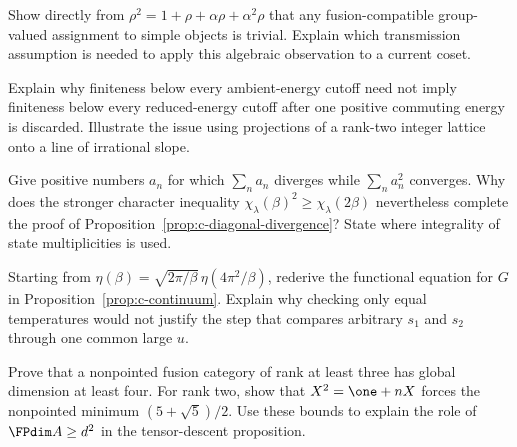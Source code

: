\begin{exercise}\label{ex:c-coset-6}
Show directly from $\rho^2=1+\rho+\alpha\rho+\alpha^2\rho$
that any fusion-compatible group-valued assignment to simple objects
is trivial. Explain which transmission assumption is needed to apply
this algebraic observation to a current coset.

\par\smallskip{}\par
\end{exercise}
\begin{exercise}\label{ex:c-coset-7}
Explain why finiteness below every ambient-energy cutoff need not
imply finiteness below every reduced-energy cutoff after one positive
commuting energy is discarded. Illustrate the issue using projections of a
rank-two integer lattice onto a line of irrational slope.

\par\smallskip{}\par
\end{exercise}
\begin{exercise}\label{ex:c-coset-8}
Give positive numbers $a_n$ for which $\sum_n a_n$ diverges while
$\sum_n a_n^2$ converges. Why does the stronger character inequality
$\chi_\lambda(\beta)^2\geq\chi_\lambda(2\beta)$ nevertheless complete
the proof of Proposition~\ref{prop:c-diagonal-divergence}?
State where integrality of state multiplicities is used.

\par\smallskip{}\par
\end{exercise}
\begin{exercise}\label{ex:c-coset-9}
Starting from $\eta(\beta)=\sqrt{2\pi/\beta}\,
\eta(4\pi^2/\beta)$, rederive the functional equation for $G$ in
Proposition~\ref{prop:c-continuum}. Explain why checking only equal
temperatures would not justify the step that compares arbitrary
$s_1$ and $s_2$ through one common large $u$.

\par\smallskip{}\par
\end{exercise}
\begin{exercise}\label{ex:c-coset-10}
Prove that a nonpointed fusion category of rank at least three has
global dimension at least four. For rank two, show that
$X^2=\one+nX$ forces the nonpointed minimum
$(5+\sqrt5)/2$. Use these bounds to explain the role of
$\FPdim A\geq d^2$ in the tensor-descent proposition.

\par\smallskip{}\par
\end{exercise}
